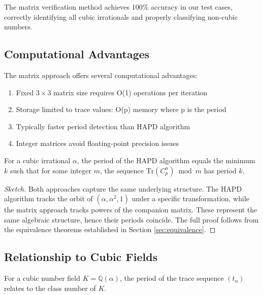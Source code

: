 The matrix verification method achieves 100\% accuracy in our test cases, correctly identifying all cubic irrationals and properly classifying non-cubic numbers.

\subsection{Computational Advantages}

\begin{proposition}
The matrix approach offers several computational advantages:
\begin{enumerate}
    \item Fixed $3 \times 3$ matrix size requires O(1) operations per iteration
    \item Storage limited to trace values: O(p) memory where p is the period
    \item Typically faster period detection than HAPD algorithm
    \item Integer matrices avoid floating-point precision issues
\end{enumerate}
\end{proposition}

\begin{theorem}\label{thm:matrix_hapd_equiv}
For a cubic irrational $\alpha$, the period of the HAPD algorithm equals the minimum $k$ such that for some integer $m$, the sequence $\text{Tr}(C_p^n) \bmod m$ has period $k$.
\end{theorem}

\begin{proof}[Sketch]
Both approaches capture the same underlying structure. The HAPD algorithm tracks the orbit of $(\alpha, \alpha^2, 1)$ under a specific transformation, while the matrix approach tracks powers of the companion matrix. These represent the same algebraic structure, hence their periods coincide. The full proof follows from the equivalence theorems established in Section \ref{sec:equivalence}.
\end{proof}

\subsection{Relationship to Cubic Fields}

\begin{theorem}\label{thm:trace_class_number}
For a cubic number field $K = \mathbb{Q}(\alpha)$, the period of the trace sequence $(t_n)$ relates to the class number of $K$.
\end{theorem}

